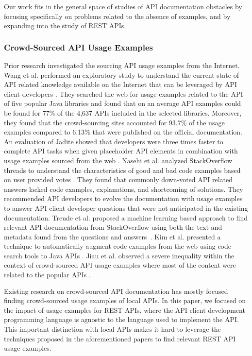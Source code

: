 \documentclass[conference]{IEEEtran}
\begin{document}
Our work fits in the general space of studies of API documentation obstacles by focusing specifically on problems related to the absence of examples, and by expanding into the study of REST APIs.

\subsubsection{Crowd-Sourced API Usage Examples}
Prior research investigated the sourcing API usage examples from the Internet. Wang et al. performed an exploratory study to understand the current state of API related knowledge available on the Internet that can be leveraged by API client developers \cite{6462686}. They searched the web for usage examples related to the API of five popular Java libraries and found that on an average API examples could be found for 77\% of the 4,637 APIs included in the selected libraries. Moreover, they found that the crowd-sourcing sites accounted for 93.7\% of the usage examples compared to 6.13\% that were published on the official documentation. An evaluation of Jadite showed that developers were three times faster to complete API tasks when given placeholder API elements in combination with usage examples sourced from the web \cite{5295283}. Nasehi et al. analyzed StackOverflow threads to understand the characteristics of good and bad code examples based on user provided votes \cite{Nasehi_what_makes}. They found that commonly down-voted API related answers lacked code examples, explanations, and shortcoming of solutions. They recommended API developers to evolve the documentation with usage examples to answer API client developer questions that were not anticipated in the existing documentation. Treude et al. proposed a machine learning based approach to find relevant API documentation from StackOverflow using both the text and metadata found from the questions and answers~\cite{Treude:2016:AAD:2884781.2884800}. Kim et al. presented a technique to automatically augment code examples from the web using code search tools to Java APIs \cite{Kim:2009:AEJ:1747491.1747552}. Jiau et al. observed a severe inequality within the context of crowd-sourced API usage examples where most of the content were related to the popular APIs \cite{jiau}.

Existing research on crowd-sourced API documentation has mostly focused finding crowd-sourced usage examples of local APIs. In this paper, we focused on the impact of usage examples for REST APIs, where the API client development programming language is agnostic to the language used to implement the API. This important distinction with local APIs makes it hard to leverage the techniques proposed in the aforementioned papers to find relevant REST API usage examples.
\end{document}

